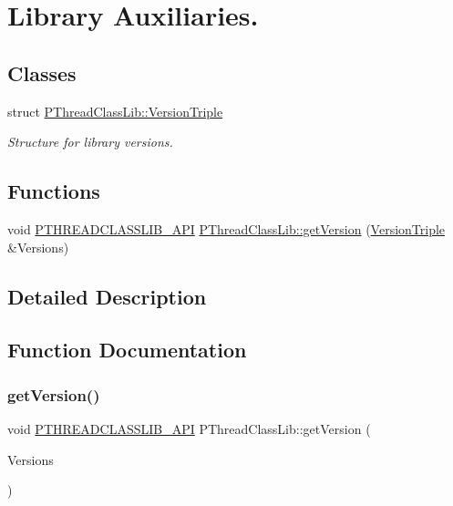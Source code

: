 \hypertarget{group__LIB__GROUP}{}\section{Library Auxiliaries.}
\label{group__LIB__GROUP}
\subsection*{Classes}
\begin{DoxyCompactItemize}
\item 
struct \hyperlink{structPThreadClassLib_1_1VersionTriple}{P\+Thread\+Class\+Lib\+::\+Version\+Triple}
\begin{DoxyCompactList}\small\item\em Structure for library versions. \end{DoxyCompactList}\end{DoxyCompactItemize}
\subsection*{Functions}
\begin{DoxyCompactItemize}
\item 
void \hyperlink{PThreadClassLib_8h_a7a7c16bf26ea875bcbc5bd1535989b45}{P\+T\+H\+R\+E\+A\+D\+C\+L\+A\+S\+S\+L\+I\+B\+\_\+\+A\+PI} \hyperlink{group__LIB__GROUP_ga6f7b61fdb8dcf8b5602c655ac81daef8}{P\+Thread\+Class\+Lib\+::get\+Version} (\hyperlink{structPThreadClassLib_1_1VersionTriple}{Version\+Triple} \&Versions)
\end{DoxyCompactItemize}


\subsection{Detailed Description}


\subsection{Function Documentation}
\mbox{\label{group__LIB__GROUP_ga6f7b61fdb8dcf8b5602c655ac81daef8}} 
\subsubsection{\texorpdfstring{get\+Version()}{getVersion()}}
{\footnotesize\ttfamily void \hyperlink{PThreadClassLib_8h_a7a7c16bf26ea875bcbc5bd1535989b45}{P\+T\+H\+R\+E\+A\+D\+C\+L\+A\+S\+S\+L\+I\+B\+\_\+\+A\+PI} P\+Thread\+Class\+Lib\+::get\+Version (\begin{DoxyParamCaption}\item[{\hyperlink{structPThreadClassLib_1_1VersionTriple}{P\+Thread\+Class\+Lib\+::\+Version\+Triple} \&}]{Versions }\end{DoxyParamCaption})}


